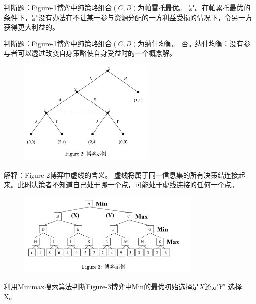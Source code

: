\begin{problem}
	判断题：Figure-1博弈中纯策略组合$(C,D)$为帕雷托最优。
	\solution 是。在帕累托最优的条件下，是没有办法在不让某一参与资源分配的一方利益受损的情况下，令另一方获得更大利益的。
\end{problem}

\begin{problem}
	判断题：Figure-1博弈中纯策略组合$(C,D)$为纳什均衡。
	\solution 否。纳什均衡：没有参与者可以透过改变自身策略使自身受益时的一个概念解。
\end{problem}

\begin{figure}[htbp]
	\centering\label{fig:2}
	\includegraphics[width=0.6\textwidth]{./figure/fig2.png}
\end{figure}

\begin{problem}
	解释：Figure-2博弈中虚线的含义。
	\solution 虚线将属于同一信息集的所有决策结连接起来。此时决策者不知道自己处于哪一个点，可能处于虚线连接的任何一个点。
\end{problem}

\begin{figure}[htbp]
	\centering\label{fig:3}
	\includegraphics[width=0.8\textwidth]{./figure/fig3.png}
\end{figure}

\begin{problem}
	利用Minimax搜索算法判断Figure-3博弈中Min的最优初始选择是$X$还是$Y$?
	\solution 选择X。
\end{problem}

